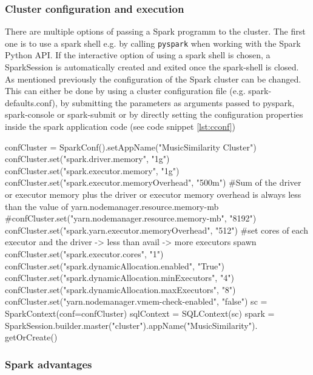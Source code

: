 \subsubsection{Cluster configuration and execution}\label{cconfexp}


There are multiple options of passing a Spark programm to the cluster. The first one is to use a spark shell e.g. by calling \lstinline{pyspark} when working with the Spark Python API. If the interactive option of using a spark shell is chosen, a SparkSession is automatically created and exited once the spark-shell is closed. 
As mentioned previously the configuration of the Spark cluster can be changed. This can either be done by using a cluster configuration file (e.g. spark-defaults.conf), by submitting the parameters as arguments passed to pyspark, spark-console or spark-submit or by directly setting the configuration properties inside the spark application code (see code snippet \ref{lst:cconf})\\


\begin{pythonCode}[frame=single,label={lst:cconf},caption={example cluster configuration python},captionpos=b]
confCluster = SparkConf().setAppName("MusicSimilarity Cluster")
confCluster.set("spark.driver.memory", "1g")
confCluster.set("spark.executor.memory", "1g")
confCluster.set("spark.executor.memoryOverhead", "500m")
#Sum of the driver or executor memory plus the driver or executor memory overhead is always less than the value of yarn.nodemanager.resource.memory-mb
#confCluster.set("yarn.nodemanager.resource.memory-mb", "8192")
confCluster.set("spark.yarn.executor.memoryOverhead", "512")
#set cores of each executor and the driver -> less than avail -> more executors spawn
confCluster.set("spark.executor.cores", "1")
confCluster.set("spark.dynamicAllocation.enabled", "True")
confCluster.set("spark.dynamicAllocation.minExecutors", "4")
confCluster.set("spark.dynamicAllocation.maxExecutors", "8")
confCluster.set("yarn.nodemanager.vmem-check-enabled", "false")
sc = SparkContext(conf=confCluster)
sqlContext = SQLContext(sc)
spark = SparkSession.builder.master("cluster").appName("MusicSimilarity").
	getOrCreate()
\end{pythonCode}

\subsubsection{Spark advantages}

